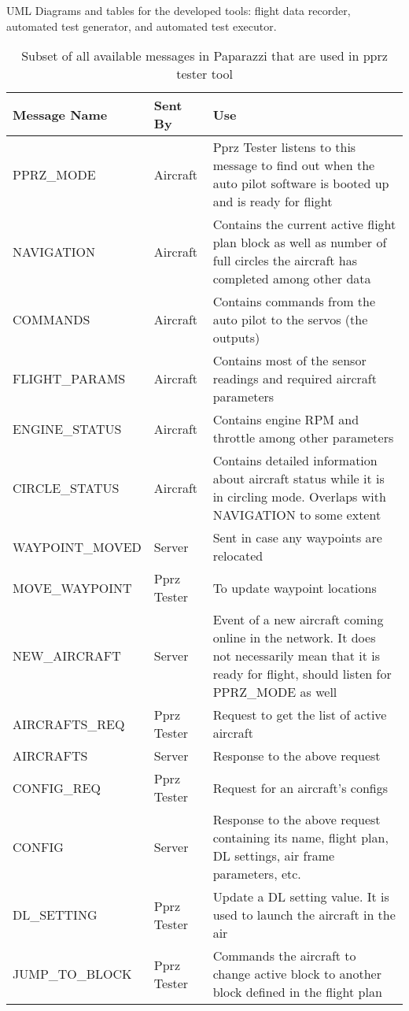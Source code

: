 UML Diagrams and tables for the developed tools: flight data recorder, automated test generator, and automated test executor.
\begin{table}[]
    \centering
\begin{longtable}{llp{}}
\hline
\textbf{Message Name }   & \textbf{Sent By }    & \textbf{Use}                                                                     \\ \hline
\endhead
%
\hline
\endfoot
%
\endlastfoot
%
PPRZ\_MODE &
  Aircraft &
  Pprz Tester listens to this message to find out when the auto pilot software is booted up and is ready for flight \\
NAVIGATION &
  Aircraft &
  Contains the current active flight plan block as well as number of full circles the aircraft has completed among other data \\
COMMANDS        & Aircraft    & Contains commands from the auto pilot to the servos (the outputs)       \\
FLIGHT\_PARAMS  & Aircraft    & Contains most of the sensor readings and required aircraft parameters   \\
ENGINE\_STATUS  & Aircraft    & Contains engine RPM and throttle among other parameters                 \\
CIRCLE\_STATUS &
  Aircraft &
  Contains detailed information about aircraft status while it is in circling mode. Overlaps with NAVIGATION to some extent \\
WAYPOINT\_MOVED & Server      & Sent in case any waypoints are relocated                                \\
MOVE\_WAYPOINT  & Pprz Tester & To update waypoint locations                                            \\
NEW\_AIRCRAFT &
  Server &
  Event of a new aircraft coming online in the network. It does not necessarily mean that it is ready for flight, should listen for PPRZ\_MODE as well \\
AIRCRAFTS\_REQ  & Pprz Tester & Request to get the list of active aircraft                              \\
AIRCRAFTS       & Server      & Response to the above request                                           \\
CONFIG\_REQ     & Pprz Tester & Request for an aircraft's configs                                       \\
CONFIG &
  Server &
  Response to the above request containing  its name, flight plan, DL settings, air frame parameters, etc. \\
DL\_SETTING     & Pprz Tester & Update a DL setting value. It is used to launch the aircraft in the air \\
JUMP\_TO\_BLOCK & Pprz Tester & Commands the aircraft to change active block to another block defined in the flight plan  \\ \hline
\end{longtable}
\caption{Subset of all available messages in Paparazzi that are used in pprz tester tool}
\label{tab:pprz_messages}
\end{table}

